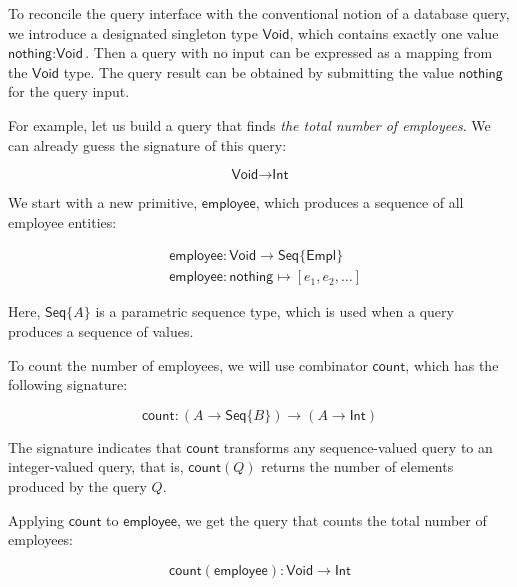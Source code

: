To reconcile the query interface with the conventional notion of a database
query, we introduce a designated singleton type $\textsf{Void}$, which contains
exactly one value $\textsf{nothing}:\textsf{Void}$.  Then a query with no input
can be expressed as a mapping from the $\textsf{Void}$ type.  The query result
can be obtained by submitting the value $\textsf{nothing}$ for the query input.

For example, let us build a query that finds \emph{the total number of
employees}.  We can already guess the signature of this query:

\begin{equation*}
\textsf{Void} \to \textsf{Int}
\end{equation*}

We start with a new primitive, $\textsf{employee}$, which produces a sequence
of all employee entities:

\begin{align*}
& \textsf{employee} : \textsf{Void} \to \textsf{Seq}\{\textsf{Empl}\} \\
& \textsf{employee} : \textsf{nothing} \mapsto [e_1, e_2, \ldots]
\end{align*}

Here, $\textsf{Seq}\{A\}$ is a parametric sequence type, which is used
when a query produces a sequence of values.

To count the number of employees, we will use combinator $\textsf{count}$,
which has the following signature:

\begin{equation*}
\textsf{count} : (A \to \textsf{Seq}\{B\}) \to (A \to \textsf{Int})
\end{equation*}

The signature indicates that $\textsf{count}$ transforms any sequence-valued
query to an integer-valued query, that is, $\textsf{count}(Q)$ returns the
number of elements produced by the query $Q$.

Applying $\textsf{count}$ to $\textsf{employee}$, we get the query that counts
the total number of employees:

\begin{equation*}
\textsf{count}(\textsf{employee}) : \textsf{Void} \to \textsf{Int}
\end{equation*}

